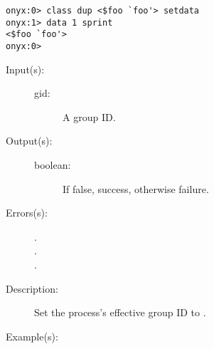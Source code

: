 \begin{description}
\begin{description}
\begin{verbatim}
onyx:0> class dup <$foo `foo'> setdata
onyx:1> data 1 sprint
<$foo `foo'>
onyx:0>
		\end{verbatim}
	\end{description}
\label{systemdict:setegid}
\item[{\onyxop{gid}{setegid}{boolean}}: ]
	\begin{description}\item[]
	\item[Input(s): ]
		\begin{description}\item[]
		\item[gid: ]
			A group ID.
		\end{description}
	\item[Output(s): ]
		\begin{description}\item[]
		\item[boolean: ]
			If false, success, otherwise failure.
		\end{description}
	\item[Errors(s): ]
		\begin{description}\item[]
		\item[.]
		\item[.]
		\item[.]
		\end{description}
	\item[Description: ]
		Set the process's effective group ID to .
	\item[Example(s): ]\begin{verbatim}


\end{verbatim}
\end{description}
\end{description}
